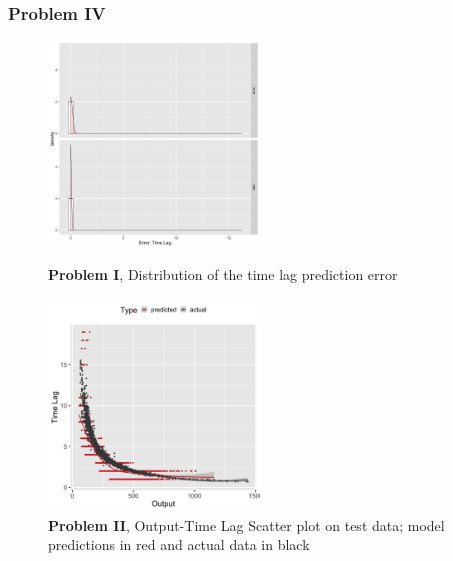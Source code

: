 \documentclass[twoside]{article}
\begin{document}
\subsubsection{Problem IV}

\begin{figure}[h]
\vspace{.3in}

\centerline{\label{fig:problem1}\includegraphics[width=0.5\textwidth]{figures/exp1_hist_errors_timelag.png}}
\vspace{.3in}
\caption{\textbf{Problem I}, Distribution of the time lag prediction error}
\end{figure}



\begin{figure}[h]\label{fig:problem2_scatter}
\vspace{.3in}
\centerline{\includegraphics[width=0.5\textwidth]{figures/exp2_scatter_v_tl.png}}
\vspace{.3in}
\caption{\textbf{Problem II}, Output-Time Lag Scatter plot on test data; model predictions in red and actual data in black}
\end{figure}
\end{document}
